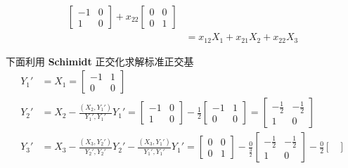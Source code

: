 \begin{solution}
\begin{enumerate}
\begin{align*}
\begin{bmatrix}
                                    -1 & 0 \\ 1 & 0
                                \end{bmatrix} + x_{22}\begin{bmatrix}
                                    0 & 0 \\ 0 & 1
                                \end{bmatrix} \\ &= x_{12}X_1 + x_{21}X_2 + x_{22}X_3
                            \end{align*}
                        \par 下面利用 \textbf{Schimidt} 正交化求解标准正交基
                            \begin{align*}
                                Y_1' &= X_1 = \begin{bmatrix}
                                    -1 & 1 \\ 0 & 0
                                \end{bmatrix} \\ Y_2' &= X_2 - \frac{(X_2, Y_1')}{Y_1', Y_1'}Y_1' = \begin{bmatrix}
                                    -1 & 0 \\ 1 & 0
                                \end{bmatrix} - \frac{1}{2}\begin{bmatrix}
                                    -1 & 1 \\ 0 & 0
                                \end{bmatrix} = \begin{bmatrix}
                                    -\frac{1}{2} & -\frac{1}{2} \\ 1 & 0
                                \end{bmatrix} \\ Y_3' &= X_3 - \frac{(X_3, Y_2')}{Y_2', Y_2'}Y_2' - \frac{(X_3, Y_1')}{Y_1', Y_1'}Y_1' = \begin{bmatrix}
                                    0 & 0 \\ 0 & 1
                                \end{bmatrix} - \frac{0}{\frac{3}{2}}\begin{bmatrix}
                                    -\frac{1}{2} & -\frac{1}{2} \\ 1 & 0
                                \end{bmatrix} - \frac{0}{2}\begin{bmatrix}

\end{bmatrix}
\end{align*}
\end{enumerate}
\end{solution}
